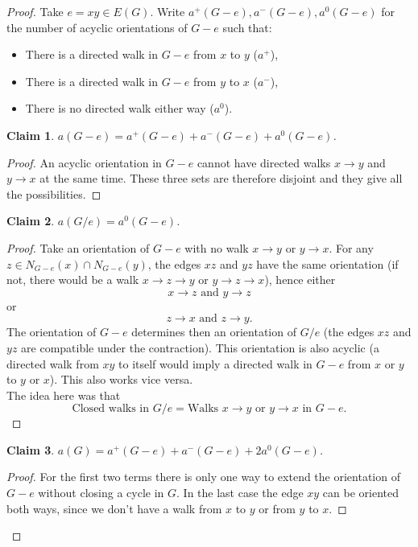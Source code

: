 \documentclass[a4paper]{article}
\theoremstyle{plain}
\newtheorem*{claim}{Claim}
\theoremstyle{myremark}
\begin{document}
\begin{proof}
Take $e=xy \in E(G)$. Write $a^+(G-e),a^-(G-e),a^0(G-e)$ for the number of acyclic orientations of $G-e$ such that:
\begin{itemize}
\item There is a directed walk in $G-e$ from $x$ to $y$ ($a^+$),
\item There is a directed walk in $G-e$ from $y$ to $x$ ($a^-$),
\item There is no directed walk either way ($a^0$).
\end{itemize}

\begin{claim} $a(G-e)=a^+(G-e)+a^-(G-e)+a^0(G-e)$. 
\end{claim}
\begin{proof}
An acyclic orientation in $G-e$ cannot have directed walks $x\longrightarrow y$ and $y\longrightarrow x$ at the same time. These three sets are therefore disjoint and they give all the possibilities.
\end{proof}

\begin{claim} $a(G/e)=a^0(G-e)$. 
\end{claim}
\begin{proof}
Take an orientation of $G-e$ with no walk $x\longrightarrow y$ or $y\longrightarrow x$. For any $z\in N_{G-e}(x)\cap N_{G-e}(y)$, the edges $xz$ and $yz$ have the same orientation (if not, there would be a walk $x\longrightarrow z\longrightarrow y$ or $y\longrightarrow z\longrightarrow x$), hence either  
$$x\longrightarrow z \text{ and } y\longrightarrow z$$
or
$$z\longrightarrow x \text{ and } z\longrightarrow y.$$
The orientation of $G-e$ determines then an orientation of $G/e$ (the edges $xz$ and $yz$ are compatible under the contraction). This orientation is also acyclic (a directed walk from $xy$ to itself would imply a directed walk in $G-e$ from $x$ or $y$ to $y$ or $x$). This also works vice versa.
\\ The idea here was that 
$$\text{Closed walks in } G/e = \text{Walks } x\longrightarrow y \text{ or } y\longrightarrow x \text { in } G-e.$$
\end{proof}

\begin{claim} 
$a(G)=a^+(G-e)+a^-(G-e)+2a^0(G-e)$. 
\end{claim}
\begin{proof}
For the first two terms there is only one way to extend the orientation of $G-e$ without closing a cycle in $G$. In the last case the edge $xy$ can be oriented both ways, since we don't have a walk from $x$ to $y$ or from $y$ to $x$.
\end{proof}


\end{proof}
\end{document}
